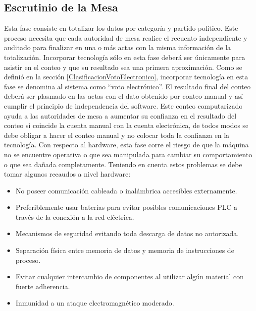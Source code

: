\subsection{Escrutinio de la Mesa} 
Esta fase consiste en totalizar los datos por categoría y partido político. Este proceso necesita que cada autoridad de mesa realice el recuento independiente y auditado para finalizar en una o más actas con la misma información de la totalización. Incorporar tecnología sólo en esta fase deberá ser únicamente para asistir en el conteo y que su resultado sea una primera aproximación. Como se definió en la sección \ref{ClasificacionVotoElectronico}, incorporar tecnología en esta fase se denomina al sistema como ``voto electrónico''. El resultado final del conteo deberá ser plasmado en las actas con el dato obtenido por conteo manual y así cumplir el principio de independencia del software. 
Este conteo computarizado ayuda a las autoridades de mesa a aumentar su confianza en el resultado del conteo si coincide la cuenta manual con la cuenta electrónica, de todos modos se debe obligar a hacer el conteo manual y no colocar toda la confianza en la tecnología.
Con respecto al hardware, esta fase corre el riesgo de que la máquina no se encuentre operativa o que sea manipulada para cambiar su comportamiento o que sea dañada completamente. Teniendo en cuenta estos problemas se debe tomar algunos recaudos a nivel hardware:
    \begin{itemize}
        \item No poseer comunicación cableada o inalámbrica accesibles externamente.
        \item Preferiblemente usar baterías para evitar posibles comunicaciones PLC a través de la conexión a la red eléctrica.
        \item Mecanismos de seguridad evitando toda descarga de datos no autorizada.
        \item Separación física entre memoria de datos y memoria de instrucciones de proceso.
        \item Evitar cualquier intercambio de componentes al utilizar algún material con fuerte adherencia.
        \item Inmunidad a un ataque electromagnético moderado.
    \end{itemize}
    
